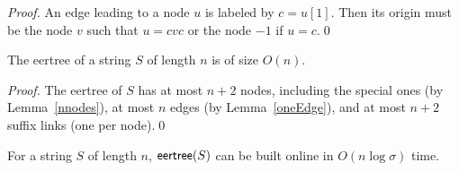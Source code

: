 \documentclass{llncs}
\def\eertree{{\sf eertree}}
\begin{document}
\begin{proof}
An edge leading to a node $u$ is labeled by $c=u[1]$. Then its origin must be the node $v$ such that $u=cvc$ or the node $-1$ if $u=c$.\qed
\end{proof}

\begin{proposition} \label{spacen}
The eertree of a string $S$ of length $n$ is of size $O(n)$.
\end{proposition}

\begin{proof}
The eertree of $S$ has at most $n{+}2$ nodes, including the special ones (by Lemma~\ref{nnodes}), at most $n$ edges (by Lemma~\ref{oneEdge}), and at most $n{+}2$ suffix links (one per node).\qed
\end{proof}

\begin{proposition} \label{nlogsigma}
For a string $S$ of length $n$, $\eertree(S)$ can be built online in $O(n\log\sigma)$ time.
\end{proposition}
\end{document}

